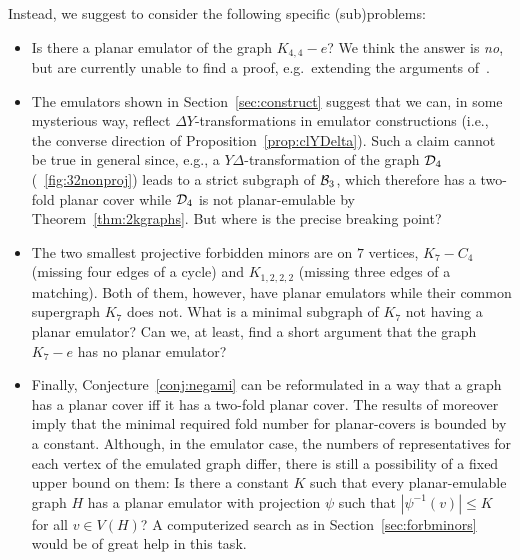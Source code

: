 \documentclass[envcountsect,envcountsame]{llncs}
\def\ca#1{{\cal #1}}
\begin{document}
Instead, we suggest to consider the following specific (sub)problems:
\begin{itemize}\parskip2pt
\item
Is there a planar emulator of the graph $K_{4,4}-e$?
We think the answer is {\em no}, but are currently unable to find a proof,
e.g.\ extending the arguments of~\cite{cit:k44-e}.
\item
The emulators shown in Section~\ref{sec:construct} suggest that
we can, in some mysterious way, reflect $\Delta Y$-transformations in
emulator constructions (i.e., the converse direction of
Proposition~\ref{prop:clYDelta}).
Such a claim cannot be true in general since, e.g.,
a $Y\!\Delta$-transformation of the graph $\ca D_4$
(\figurename~\ref{fig:32nonproj}) leads to a strict subgraph of $\ca B_3$,
which therefore has a two-fold planar cover while $\ca D_4$ is not
planar-emulable by Theorem~\ref{thm:2kgraphs}.
But where is the precise breaking point?
\item
The two smallest projective forbidden minors are on $7$
vertices, $K_7-C_4$ (missing four edges of a cycle) 
and $K_{1,2,2,2}$ (missing three edges of a matching).
Both of them, however, have planar emulators while their common supergraph
$K_7$ does not.
What is a minimal subgraph of $K_7$ not having a planar emulator?
Can we, at least, find a short argument that the graph $K_7-e$ has no planar
emulator?
\item
Finally, Conjecture~\ref{conj:negami} can be reformulated in a way that a
graph has a planar cover iff it has a two-fold planar cover.
The results of \cite{cit:counterex} moreover imply that the minimal
required fold number for planar-covers is bounded by a constant.
Although, in the emulator case, the numbers of representatives for each
vertex of the emulated graph differ, there is still a possibility of a fixed
upper bound on them:
Is there a constant $K$ such that every planar-emulable graph $H$ has a
planar emulator with projection $\psi$ such that $|\psi^{-1}(v)|\leq K$ for
all $v\in V(H)$?
A computerized search as in Section~\ref{sec:forbminors} would be of great
help in this task.
\end{itemize}
\end{document}

